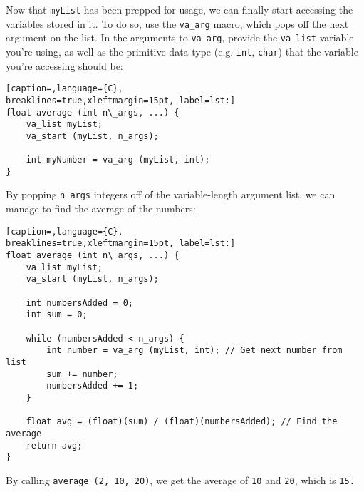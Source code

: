 Now that \texttt{myList} has been prepped for usage, we can finally start
accessing the variables stored in it. To do so, use the \texttt{va\_arg} macro,
which pops off the next argument on the list. In the arguments to
\texttt{va\_arg}, provide the \texttt{va\_list} variable you're using, as well
as the primitive data type (e.g. \texttt{int}, \texttt{char}) that the variable
you're accessing should be:
\lstset{basicstyle=\scriptsize, numbers=left, captionpos=b, tabsize=4}
\begin{lstlisting}[caption=,language={C},
breaklines=true,xleftmargin=15pt, label=lst:]
float average (int n\_args, ...) {
	va_list myList;
	va_start (myList, n_args);
	
	int myNumber = va_arg (myList, int);
}
\end{lstlisting}

By popping \texttt{n\_args} integers off of the variable-length argument list,
we can manage to find the average of the numbers:
\lstset{basicstyle=\scriptsize, numbers=left, captionpos=b, tabsize=4}
\begin{lstlisting}[caption=,language={C},
breaklines=true,xleftmargin=15pt, label=lst:]
float average (int n\_args, ...) {
	va_list myList;
	va_start (myList, n_args);
	
	int numbersAdded = 0;
	int sum = 0;
	 
	while (numbersAdded < n_args) {
		int number = va_arg (myList, int); // Get next number from list
		sum += number;
		numbersAdded += 1;
	}
	 
	float avg = (float)(sum) / (float)(numbersAdded); // Find the average
	return avg;
}
\end{lstlisting}

By calling \texttt{average (2, 10, 20)}, we get the average of \texttt{10} and
\texttt{20}, which is \texttt{15.}
